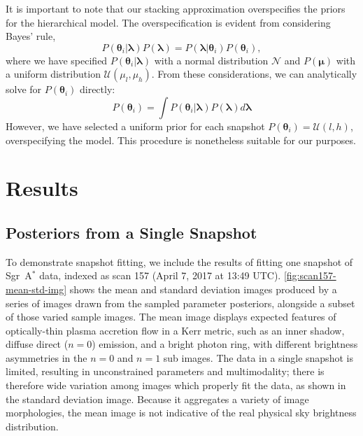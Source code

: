 \documentclass[linenumbers, twocolumn, tighten]{aastex701}
\def\sgra{Sgr~A$^*$\xspace}
\begin{document}
It is important to note that our stacking approximation overspecifies the priors for the hierarchical model. 
The overspecification is evident from considering Bayes' rule,
\begin{equation}
    P(\boldsymbol{\theta}_i|\boldsymbol{\lambda})P(\boldsymbol{\lambda}) = P(\boldsymbol{\lambda}|\boldsymbol{\theta}_i)P(\boldsymbol{\theta}_i),
\end{equation}
where we have specified $P(\boldsymbol{\theta}_i|\boldsymbol{\lambda})$ with a normal distribution $\mathcal{N}$ and $P(\boldsymbol{\mu})$ with a uniform distribution $\mathcal{U}(\mu_l, \mu_h)$. 
From these considerations, we can analytically solve for $P(\boldsymbol{\theta}_i)$ directly:
\begin{equation}
    P(\boldsymbol{\theta}_i) = \int P(\boldsymbol{\theta}_i|\boldsymbol{\lambda}) P(\boldsymbol{\lambda}) d\boldsymbol{\lambda}
\end{equation}
However, we have selected a uniform prior for each snapshot $P(\boldsymbol{\theta}_i) = \mathcal{U}(l, h)$, overspecifying the model. This procedure is nonetheless suitable for our purposes.


\section{Results} \label{sec:results}


\subsection{Posteriors from a Single Snapshot} \label{subsec:snapshot}

To demonstrate snapshot fitting, we include the results of fitting one snapshot of \sgra data, indexed as scan 157 (April 7, 2017 at 13:49 UTC). \autoref{fig:scan157-mean-std-img} shows the mean and standard deviation images produced by a series of images drawn from the sampled parameter posteriors, alongside a subset of those varied sample images. The mean image displays expected features of optically-thin plasma accretion flow in a Kerr metric, such as an inner shadow, diffuse direct ($n=0$) emission, and a bright photon ring, with different brightness asymmetries in the $n=0$ and $n=1$ sub images. The data in a single snapshot is limited, resulting in unconstrained parameters and multimodality; there is therefore wide variation among images which properly fit the data, as shown in the standard deviation image. Because it aggregates a variety of image morphologies, the mean image is not indicative of the real physical sky brightness distribution.
\end{document}
